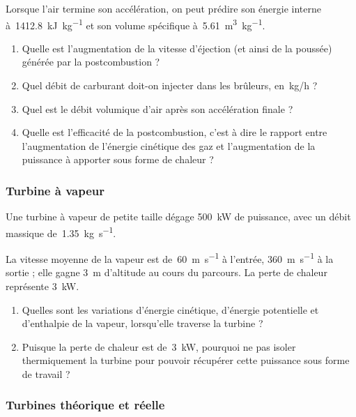 	Lorsque l’air termine son accélération, on peut prédire son énergie interne à~\SI{1412,8}{\kilo\joule\per\kilogram} et son volume spécifique à~\SI{5,61}{\metre\cubed\per\kilogram}.
	
	\begin{enumerate}
		\item Quelle est l’augmentation de la vitesse d’éjection (et ainsi de la poussée) générée par la postcombustion ?
		\item Quel débit de carburant doit-on injecter dans les brûleurs, en~\si[per-mode=symbol]{\kilogram\per\hour} ?
		\item Quel est le débit volumique d’air après son accélération finale ?
		\item Quelle est l’efficacité de la postcombustion, c’est à dire le rapport entre l’augmentation de l’énergie cinétique des gaz et l’augmentation de la puissance à apporter sous forme de chaleur ?
	\end{enumerate}

	
\subsubsection{Turbine à vapeur}
\label{exo_turbine_vapeur_2}

	Une turbine à vapeur de petite taille dégage \SI{500}{\kilo\watt} de puissance, avec un débit massique de~\SI{1,35}{\kilogram\per\second}.
	
	La vitesse moyenne de la vapeur est de~\SI{60}{\metre\per\second} à l’entrée, \SI{360}{\metre\per\second} à la sortie ; elle gagne \SI{3}{\metre} d’altitude au cours du parcours. La perte de chaleur représente \SI{3}{\kilo\watt}.
	
	
	\begin{enumerate}
		\item Quelles sont les variations d’énergie cinétique, d’énergie potentielle et d’enthalpie de la vapeur, lorsqu’elle traverse la turbine ?
		\item Puisque la perte de chaleur est de~\SI{3}{\kilo\watt}, pourquoi ne pas isoler thermiquement la turbine pour pouvoir récupérer cette puissance sous forme de travail ?
	\end{enumerate}
	

	
\subsubsection{Turbines théorique et réelle}
\label{exo_detente_turbine_turbomoteur}

